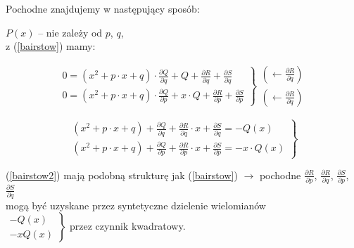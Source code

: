 \begin{frame}
  Pochodne znajdujemy w następujący sposób:

  $P(x)$ -- nie zależy od $p$, $q$, \\ z (\ref{bairstow}) mamy:

  $$\left. \begin{array}{l}
  0 = (x^2 + p \cdot x + q) \cdot \frac{{\partial}Q}{{\partial}q} + Q + \frac{{\partial}R}{{\partial}q} + \frac{{\partial}S}{{\partial}q} \\ %
  0 = (x^2 + p \cdot x + q) \cdot \frac{{\partial}Q}{{\partial}p} + x \cdot Q + \frac{{\partial}R}{{\partial}p} + \frac{{\partial}S}{{\partial}p} %
  \end{array}\right\}
  \begin{array}{l}
    \left( \leftarrow \frac{{\partial}R}{{\partial}q} \right) \\
    \left( \leftarrow \frac{{\partial}R}{{\partial}q} \right) %
  \end{array}$$

  \begin{equation}
    \left. \begin{array}{l}
    (x^2 + p \cdot x + q) + \frac{{\partial}Q}{{\partial}q} + \frac{{\partial}R}{{\partial}q} \cdot x + \frac{{\partial}S}{{\partial}q} = -Q(x) \\ %
    (x^2 + p \cdot x + q) + \frac{{\partial}Q}{{\partial}p} + \frac{{\partial}R}{{\partial}p} \cdot x + \frac{{\partial}S}{{\partial}p} = -x \cdot Q(x) %
    \end{array}\right\}
    \label{bairstow2}
  \end{equation}
\end{frame}

\begin{frame}
  (\ref{bairstow2}) mają podobną strukturę jak (\ref{bairstow}) $\rightarrow$ pochodne $\frac{{\partial}R}{{\partial}p}$, $\frac{{\partial}R}{{\partial}q}$, $\frac{{\partial}S}{{\partial}p}$, $\frac{{\partial}S}{{\partial}q}$ \\ \vspace{2mm} mogą być uzyskane przez syntetyczne dzielenie wielomianów \\ \vspace{3mm} $\left.\begin{array}{l} -Q(x) \\ -x Q(x) \end{array} \right\}$ przez czynnik kwadratowy.
\end{frame}
